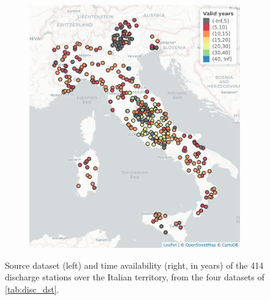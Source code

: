 \begin{figure}
\begin{subfigure}{.475\textwidth}
        \includegraphics[width=\textwidth]{figures/allstats_ita_2}
    \end{subfigure}
    \decoRule
    \caption[Location and time availability of the 414 discharge stations considered]{Source dataset (left) and time availability (right, in years) of the 414 discharge stations over the Italian territory, from the four datasets of \cref{tab:disc_dst}.} \label{fig:disch_dst}
\end{figure}

